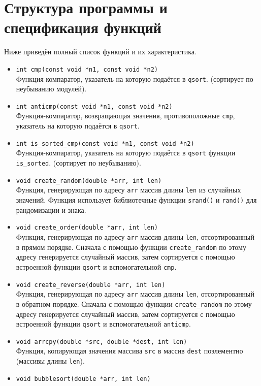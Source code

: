 \documentclass[a4paper,12pt,titlepage,final]{article}
\begin{document}
\section{Структура программы и спецификация функций}
Ниже приведён полный список функций и их характеристика.
\begin{itemize}
    \item \verb|int cmp(const void *n1, const void *n2)|\\
    Функция-компаратор, указатель на которую подаётся в \verb|qsort|. (сортирует по неубыванию модулей).
    \item \verb|int anticmp(const void *n1, const void *n2)|\\
    Функция-компаратор, возвращающая значения, противоположные \verb|cmp|, указатель на которую подаётся в \verb|qsort|.
    \item \verb|int is_sorted_cmp(const void *n1, const void *n2)|\\
    Функция-компаратор, указатель на которую подаётся в \verb|qsort| функции \verb|is_sorted|. (сортирует по неубыванию).
    \item \verb|void create_random(double *arr, int len)|\\
    Функция, генерирующая по адресу \verb|arr| массив длины \verb|len| из случайных значений. Функция использует библиотечные функции \verb|srand()| и \verb|rand()| для рандомизации и знака. 
    \item \verb|void create_order(double *arr, int len)|\\
    Функция, генерирующая по адресу \verb|arr| массив длины \verb|len|, отсортированный в прямом порядке. Сначала с помощью функции \verb|create_random| по этому адресу генерируется случайный массив, затем сортируется с помощью встроенной функции \verb|qsort| и вспомогательной \verb|cmp|.
    \item \verb|void create_reverse(double *arr, int len)|\\
    Функция, генерирующая по адресу \verb|arr| массив длины \verb|len|, отсортированный в обратном порядке. Сначала с помощью функции \verb|create_random| по этому адресу генерируется случайный массив, затем сортируется с помощью встроенной функции \verb|qsort| и вспомогательной \verb|anticmp|.
    \item \verb|void arrcpy(double *src, double *dest, int len)|\\
    Функция, копирующая значения массива \verb|src| в массив \verb|dest| поэлементно (массивы длины \verb|len|).
    \item \verb|void bubblesort(double *arr, int len)|\\

\end{itemize}
\end{document}
